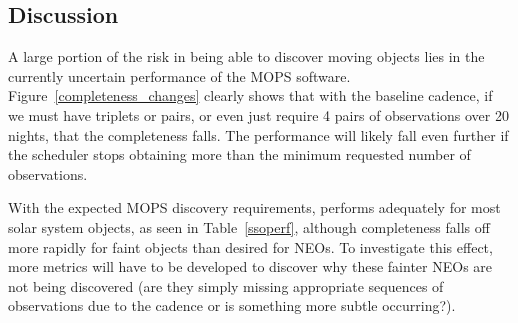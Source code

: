 
\subsection{Discussion}
\label{sec:\secname:discussion}

A large portion of the risk in being able to discover moving objects
lies in the currently uncertain performance of the MOPS
software. Figure~\ref{completeness_changes} clearly shows that with
the baseline cadence, if we must have triplets or pairs, or even just
require 4 pairs of observations over 20 nights, that the completeness
falls. The performance will likely fall even further if the scheduler
stops obtaining more than the minimum requested number of observations.

With the expected MOPS discovery requirements,
 performs adequately for most solar system
objects, as seen in Table~\ref{ssoperf}, although completeness falls off more rapidly for faint
objects than desired for NEOs. To investigate this effect, more
metrics will have to be developed to discover why these fainter NEOs
are not being discovered (are they simply missing appropriate
sequences of observations due to the cadence or is something more
subtle occurring?).

